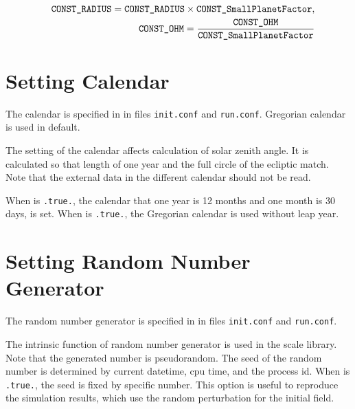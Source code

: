 \begin{eqnarray}
   && \nmitemeq{CONST_RADIUS} = \nmitemeq{CONST_RADIUS} \times \nmitemeq{CONST_SmallPlanetFactor}, \\
   && \nmitemeq{CONST_OHM}    = \frac{\nmitemeq{CONST_OHM}}{\nmitemeq{CONST_SmallPlanetFactor}}
\end{eqnarray}



\section{Setting Calendar} \label{subsec:calendar}

The calendar is specified in  in files \verb|init.conf| and \verb|run.conf|.
Gregorian calendar is used in default.


\noindent
The setting of the calendar affects calculation of solar zenith angle.
It is calculated so that length of one year and the full circle of the ecliptic match.
Note that the external data in the different calendar should not be read.

When  is \verb|.true.|,
the calendar that one year is 12 months and one month is 30 days, is set.
%
When  is \verb|.true.|,
the Gregorian calendar is used without leap year.



\section{Setting Random Number Generator} \label{subsec:random}

The random number generator is specified in  in files \verb|init.conf| and \verb|run.conf|.


\noindent
The intrinsic function of random number generator is used in the scale library. Note that the generated number is pseudorandom.
The seed of the random number is determined by current datetime, cpu time, and the process id.
%
When  is \verb|.true.|, the seed is fixed by specific number.
This option is useful to reproduce the simulation results, which use the random perturbation for the initial field.
